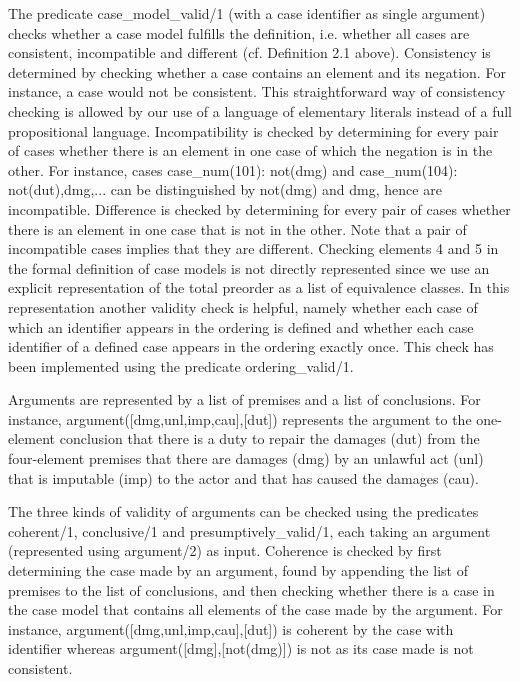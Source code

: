 \documentclass{IOS-Book-Article}
\begin{document}
The predicate {\mf case\_model\_valid/1} (with a case identifier as single argument) checks whether a case model fulfills the definition, i.e. whether all cases are consistent, incompatible and different (cf. Definition 2.1 above). Consistency is determined by checking whether a case contains an element and its negation. For instance, a case {} would not be consistent. This straightforward way of consistency checking is allowed by our use of a language of elementary literals instead of a full propositional language. Incompatibility is checked by determining for every pair of cases whether there is an element in one case of which the negation is in the other. For instance, cases 
{\mf case\_num(101): not(dmg)} and 
{\mf case\_num(104): not(dut),dmg,...} can be distinguished by {\mf not(dmg)} and {\mf dmg}, hence are incompatible. Difference is checked by determining for every pair of cases whether there is an element in one case that is not in the other. Note that a pair of incompatible cases implies that they are different. Checking elements 4 and 5 in the formal definition of case models is not directly represented since we use an explicit representation of the total preorder as a list of equivalence classes. In this representation another validity check is helpful, namely whether each case of which an identifier appears in the ordering is defined and whether each case identifier of a defined case appears in the ordering exactly once. This check has been implemented using the predicate {\mf ordering\_valid/1}.

Arguments are represented by a list of premises and a list of conclusions. For instance, {\mf argument([dmg,unl,imp,cau],[dut])} represents the argument to the one-element conclusion that there is a duty to repair the damages ({\mf dut}) from the four-element premises that there are damages ({\mf dmg}) by an unlawful act ({\mf unl}) that is imputable ({\mf imp}) to the actor and that has caused the damages ({\mf cau}).

The three kinds of validity of arguments can be checked using the predicates {\mf coherent/1}, {\mf conclusive/1} and {\mf presumptively\_valid/1}, each taking an argument (represented using {\mf argument/2}) as input. Coherence is checked by first determining the case made by an argument, found by appending the list of premises to the list of conclusions, and then checking whether there is a case in the case model that contains all elements of the case made by the argument. For instance, {\mf argument([dmg,unl,imp,cau],[dut])} is coherent by the case with identifier {} whereas {\mf argument([dmg],[not(dmg)])} is not as its case made is not consistent.
\end{document}
